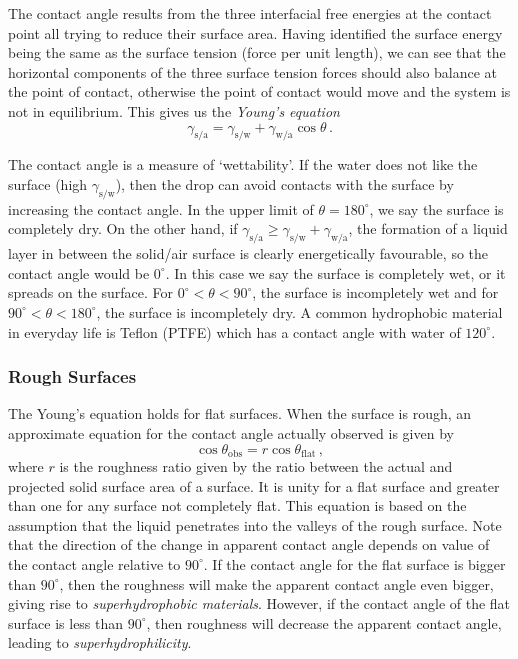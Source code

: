 \documentclass{article}
\theoremstyle{plain}\theoremheaderfont{\normalfont\itshape}\theorembodyfont{\rmfamily}\theoremseparator{.}\newtheorem*{rem}{Remark}\newtheorem*{ex}{Example}\newtheorem*{proof}{Proof}\newtheorem*{altp}{Alternative proof}
\theoremstyle{plain}\theoremheaderfont{\normalfont\bfseries}\theorembodyfont{\rmfamily}\theoremseparator{.}\newtheorem{thm}{Theorem}[section]\newtheorem{lem}[thm]{Lemma}\newtheorem{prop}[thm]{Proposition}\newtheorem*{cor}{Corollary}\newtheorem{defn}[thm]{Definition}\newtheorem{clm}[thm]{Claim}\newtheorem{clminproof}{Claim}\newtheorem*{law}{Law}\newtheorem{pos}[thm]{Postulate}
\theoremstyle{break}\theoremheaderfont{\normalfont\itshape}\theorembodyfont{\rmfamily}\theoremseparator{.\medskip}\newtheorem*{proofskip}{Proof}\newtheorem*{exs}{Examples}\newtheorem*{rems}{Remarks}
\theoremstyle{break}\theoremheaderfont{\normalfont\bfseries}\theorembodyfont{\rmfamily}\theoremseparator{.\medskip}\newtheorem{lemskip}[thm]{Lemma}\newtheorem{defnskip}[thm]{Definition}\newtheorem{propskip}[thm]{Proposition}\newtheorem{thmskip}[thm]{Theorem}
\numberwithin{equation}{section}
\begin{document}
	The contact angle results from the three interfacial free energies at the contact point all trying to reduce their surface area. Having identified the surface energy being the same as the surface tension (force per unit length), we can see that the horizontal components of the three surface tension forces should also balance at the point of contact, otherwise the point of contact would move and the system is not in equilibrium. This gives us the \textit{Young's equation}
	\begin{equation}\label{Youngs_equation}
		\gamma_{\text{s/a}}=\gamma_{\text{s/w}}+\gamma_{\text{w/a}}\cos\theta\,.
	\end{equation}

	The contact angle is a measure of `wettability'. If the water does not like the surface (high \(\gamma_{\text{s/w}}\)), then the drop can avoid contacts with the surface by increasing the contact angle. In the upper limit of \(\theta=180^\circ\), we say the surface is completely dry. On the other hand, if \(\gamma_{\text{s/a}}\ge\gamma_{\text{s/w}}+\gamma_{\text{w/a}}\), the formation of a liquid layer in between the solid/air surface is clearly energetically favourable, so the contact angle would be \(0^\circ\). In this case we say the surface is completely wet, or it spreads on the surface. For \(0^\circ<\theta<90^\circ\), the surface is incompletely wet and for \(90^\circ<\theta<180^\circ\), the surface is incompletely dry. A common hydrophobic material in everyday life is Teflon (PTFE) which has a contact angle with water of \(120^\circ\).

	\subsubsection{Rough Surfaces}
	The Young's equation holds for flat surfaces. When the surface is rough, an approximate equation for the contact angle actually observed is given by
	\begin{equation}
		\cos\theta_{\text{obs}}=r\cos\theta_{\text{flat}}\,,
	\end{equation}
	where \(r\) is the roughness ratio given by the ratio between the actual and projected solid surface area of a surface. It is unity for a flat surface and greater than one for any surface not completely flat. This equation is based on the assumption that the liquid penetrates into the valleys of the rough surface. Note that the direction of the change in apparent contact angle depends on value of the contact angle relative to \(90^\circ\). If the contact angle for the flat surface is bigger than \(90^\circ\), then the roughness will make the apparent contact angle even bigger, giving rise to \textit{superhydrophobic materials}. However, if the contact angle of the flat surface is less than \(90^\circ\), then roughness will decrease the apparent contact angle, leading to \textit{superhydrophilicity}.
\end{document}
